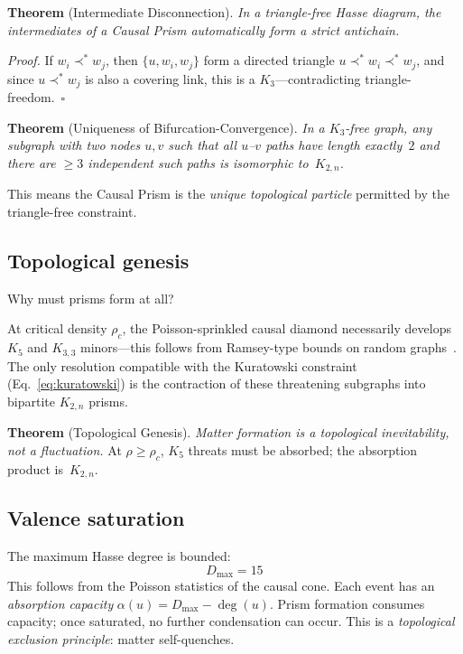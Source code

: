 \documentclass[aps,prd,twocolumn,superscriptaddress,nofootinbib,amsmath,amssymb,longbibliography]{revtex4-2}
\newcommand{\Kbn}{K_{2,n}}
\begin{document}
\textbf{Theorem} (Intermediate Disconnection).
\emph{In a triangle-free Hasse diagram, the intermediates of a Causal
Prism automatically form a strict antichain.}

\emph{Proof.}
If $w_i \prec^* w_j$, then $\{u, w_i, w_j\}$ form a directed triangle
$u \prec^* w_i \prec^* w_j$, and since $u \prec^* w_j$ is also a
covering link, this is a $K_3$---contradicting triangle-freedom.~$\square$

\textbf{Theorem} (Uniqueness of Bifurcation-Convergence).
\emph{In a $K_3$-free graph, any subgraph with two nodes $u, v$ such
that all $u$--$v$ paths have length exactly~$2$ and there are $\geq 3$
independent such paths is isomorphic to~$\Kbn$.}

This means the Causal Prism is the \emph{unique topological particle}
permitted by the triangle-free constraint.

\subsection{Topological genesis}\label{sec:genesis}

Why must prisms form at all?

At critical density $\rho_c$, the Poisson-sprinkled causal diamond
necessarily develops $K_5$ and $K_{3,3}$ minors---this follows from
Ramsey-type bounds on random graphs~\cite{diestel2017}.
The only resolution compatible with the Kuratowski constraint
(Eq.~\ref{eq:kuratowski}) is the contraction of these threatening
subgraphs into bipartite $\Kbn$ prisms.

\textbf{Theorem} (Topological Genesis).
\emph{Matter formation is a topological inevitability, not a fluctuation.}
At $\rho \geq \rho_c$, $K_5$ threats must be absorbed; the absorption
product is~$\Kbn$.

\subsection{Valence saturation}

The maximum Hasse degree is bounded:
\begin{equation}\label{eq:degree_bound}
  D_{\max} = 15
\end{equation}
This follows from the Poisson statistics of the causal cone.
Each event has an \emph{absorption capacity}
$\alpha(u) = D_{\max} - \deg(u)$.
Prism formation consumes capacity; once saturated, no further
condensation can occur.  This is a \emph{topological exclusion
principle}: matter self-quenches.
\end{document}
